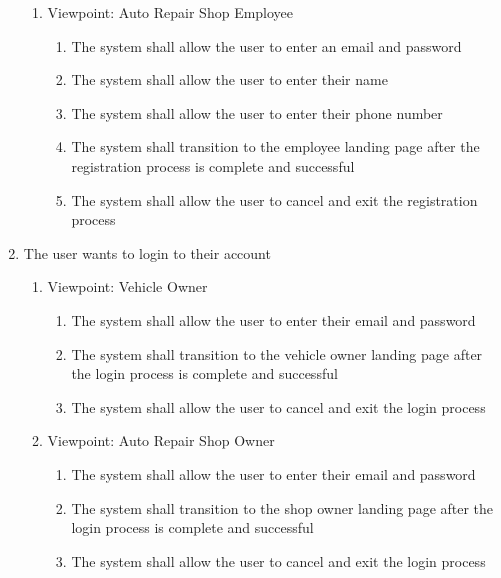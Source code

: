 \documentclass[12pt]{article}
\begin{document}
\begin{enumerate}[label=BE\arabic*., series=business_events]
\begin{enumerate}[VP\arabic*.]
		      \item Viewpoint: Auto Repair Shop Employee
		            \begin{enumerate}
			            \item The system shall allow the user to enter an email and password
			            \item The system shall allow the user to enter their name
			            \item The system shall allow the user to enter their phone number
			            \item The system shall transition to the employee landing page after the registration process is complete
			                  and successful
			            \item The system shall allow the user to cancel and exit the registration process
		            \end{enumerate}
	      \end{enumerate}

	\item The user wants to login to their account
	      \begin{enumerate}[VP\arabic*.]
		      \item Viewpoint: Vehicle Owner
		            \begin{enumerate}
			            \item The system shall allow the user to enter their email and password
			            \item The system shall transition to the vehicle owner landing page after the login process is complete
			                  and successful
			            \item The system shall allow the user to cancel and exit the login process
		            \end{enumerate}

		      \item Viewpoint: Auto Repair Shop Owner
		            \begin{enumerate}
			            \item The system shall allow the user to enter their email and password
			            \item The system shall transition to the shop owner landing page after the login process is complete and
			                  successful
			            \item The system shall allow the user to cancel and exit the login process
		            \end{enumerate}


\end{enumerate}
\end{enumerate}
\end{document}

